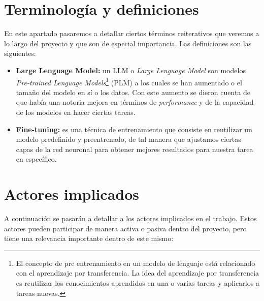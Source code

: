 \section{Terminología y definiciones}
\label{sec:terminalogia}


En este apartado pasaremos a detallar ciertos términos reiterativos que veremos a lo largo del proyecto y que son de especial importancia. Las definiciones son las siguientes:

\begin{itemize}
    \item \textbf{Large Lenguage Model:} un LLM o \textit{Large Lenguage Model} son modelos \textit{Pre-trained Lenguage Models}\footnote{El concepto de pre entrenamiento en un modelo
                                        de lenguaje está relacionado con el aprendizaje por transferencia. La idea del aprendizaje por transferencia es reutilizar los conocimientos
                                        aprendidos en una o varias tareas y aplicarlos a tareas nuevas.} (PLM) a los cuales se han aumentado o el tamaño del modelo en sí o los datos.
                                        Con este aumento se dieron cuenta de que había una notoria mejora en términos de \textit{performance} y de la capacidad de los modelos en hacer
                                        ciertas tareas. \cite{ZhaoWayneXin2023ASoL}
    \item \textbf{Fine-tuning:} es una técnica de entrenamiento que consiste en reutilizar un modelo predefinido y preentrenado, de tal manera que ajustamos ciertas capas de la
                                red neuronal para obtener mejores resultados para nuestra tarea en específico.
\end{itemize}

\section{Actores implicados}
\label{sec:actores}


A continuación se pasarán a detallar a los actores implicados en el trabajo. Estos actores pueden participar de manera activa o pasiva dentro del proyecto, pero tiene una relevancia
importante dentro de este mismo:

